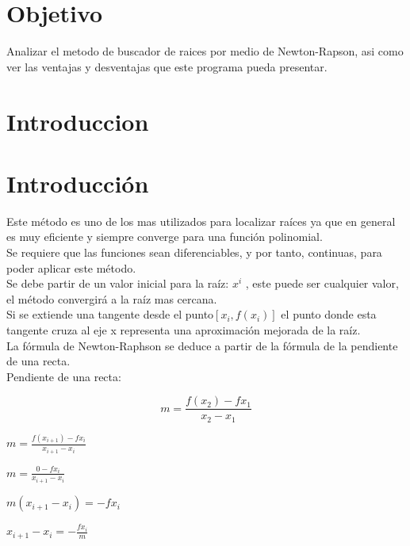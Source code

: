\documentclass{article}
\begin{document}
\begin{multicols}{2}

\section{Objetivo}
\label{sec:obj}
Analizar el metodo de buscador de raices por medio de Newton-Rapson, asi como ver las ventajas y desventajas que este programa pueda presentar.

\section{Introduccion}
\label{sec:Intro}


\section{Introducción}
\label{sec:intro}
Este método es uno de los mas utilizados para localizar raíces ya que en general es muy eficiente y siempre converge para una función polinomial.
\\
Se requiere que las funciones sean diferenciables, y por tanto, continuas, para poder aplicar este método.
\\
Se debe partir de  un valor inicial para la raíz: $x^{i}$ , este puede ser cualquier valor, el método convergirá a la raíz mas cercana.
\\
Si se extiende una tangente desde el punto$ [x_{i} ,f(x_{i})]$ el punto donde esta tangente cruza al eje x representa una aproximación mejorada de la raíz.
\\
La fórmula de Newton-Raphson se deduce a partir de la fórmula de la pendiente de una recta.
\\
Pendiente de una recta:

\begin{equation}
m=\frac{f(x_{2})-fx_{1}}{x_{2}-x_{1}}
\end{equation}

\begin{center}
$m=\frac{f(x_{i+1})-fx_{i}}{x_{i+1}-x_{i}}$
\end{center}

\begin{center}
$m=\frac{0-fx_{i}}{x_{i+1}-x_{i}}$
\end{center}

\begin{center}
$m (x_{i+1}-x_{i})=-fx_{i}$
\end{center}

\begin{center}
$x_{i+1}-x_{i}=-\frac{fx_{i}}{m}$
\end{center}


\end{multicols}
\end{document}
